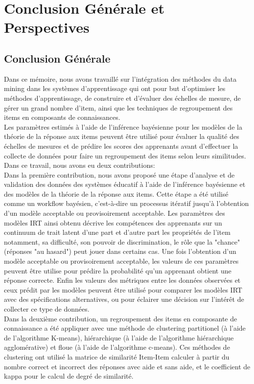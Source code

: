 \chapter*{Conclusion Générale et Perspectives }
\thispagestyle{empty}
\section*{Conclusion Générale}
Dans ce mémoire, nous avons travaillé sur l'intégration des méthodes du data mining dans les systèmes d'apprentissage qui ont pour but d’optimiser les méthodes d'apprentissage, de construire et d’évaluer des échelles de mesure, de gérer un grand nombre d’item, ainsi que les techniques de regroupement des items en composants de connaissances. \\
Les paramètres estimés à l’aide de l’inférence bayésienne pour les modèles de la théorie de la réponse aux items peuvent être utilisé pour évaluer la qualité des échelles de mesures et de prédire les scores des apprenants avant d’effectuer la collecte de données pour faire un regroupement des items selon leurs similitudes. \\
Dans ce travail, nous avons eu deux contributions: \\ 
Dans la première contribution, nous avons proposé une étape d’analyse et de validation des données des systèmes éducatif à l’aide de l’inférence bayésienne et des modèles de la théorie de la réponse aux items. Cette étape a été utilisé comme un workflow bayésien, c’est-à-dire un processus itératif jusqu’à l’obtention d’un modèle acceptable ou provisoirement acceptable. Les paramètres des modèles IRT ainsi obtenu décrive les compétences des apprenants sur un continuum de trait latent d’une part et d’autre part les propriétés de l’item notamment, sa difficulté, son pouvoir de discrimination, le rôle que la "chance" (réponses "au hasard") peut jouer dans certains cas. Une fois l’obtention d’un modèle acceptable ou provisoirement acceptable, les valeurs de ces paramètres peuvent être utilise pour prédire la probabilité qu’un apprenant obtient une réponse correcte. Enfin les valeurs des métriques entre les données observées et ceux prédit par les modèles peuvent être utilisé pour comparer les modèles IRT avec des spécifications alternatives, ou pour éclairer une décision sur l'intérêt de collecter ce type de données. \\
Dans la deuxième contribution, un regroupement des items en composante de connaissance a été appliquer avec une méthode de clustering partitionel (à l'aide de l'algorithme K-means), hiérarchique (à l'aide de l'algorithme hiérarchique agglomérative) et floue (à l'aide de l'algorithme c-means). Ces méthodes de clustering ont utilisé la matrice de similarité Item-Item calculer à partir du nombre correct et incorrect des réponses avec aide et sans aide, et le coefficient de kappa pour le calcul de degré de similarité. \\

